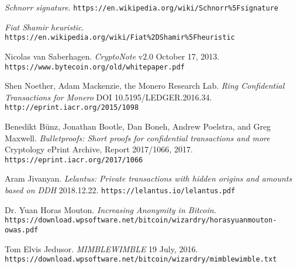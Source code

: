 \documentclass{article}
\begin{document}
\newpage
\begin{thebibliography}{8}

  \emph{Schnorr signature}.
  \texttt{https://en.wikipedia.org/wiki/Schnorr\%5Fsignature}

  \emph{Fiat Shamir heuristic}.
  \texttt{https://en.wikipedia.org/wiki/Fiat\%2DShamir\%5Fheuristic}

  Nicolas van Saberhagen.
  \emph{CryptoNote} v$2.0$ October 17, 2013.
  \texttt{https://www.bytecoin.org/old/whitepaper.pdf}

  Shen Noether, Adam Mackenzie, the Monero Research Lab.
  \emph{Ring Confidential Transactions for Monero} DOI 10.5195/LEDGER.2016.34.
  \texttt{http://eprint.iacr.org/2015/1098}

  Benedikt Bünz, Jonathan Bootle, Dan Boneh, Andrew Poelstra, and Greg Maxwell.
  \emph{Bulletproofs: Short proofs for confidential transactions and more} Cryptology ePrint Archive, Report 2017/1066, 2017.
  \texttt{https://eprint.iacr.org/2017/1066}

  Aram Jivanyan.
  \emph{Lelantus: Private transactions with hidden origins and amounts based on DDH} 2018.12.22.
  \texttt{https://lelantus.io/lelantus.pdf}

  Dr. Yuan Horas Mouton.
  \emph{Increasing Anonymity in Bitcoin}.
  \texttt{https://download.wpsoftware.net/bitcoin/wizardry/horasyuanmouton-owas.pdf}

  Tom Elvis Jedusor.
  \emph{MIMBLEWIMBLE} 19 July, 2016.
  \texttt{https://download.wpsoftware.net/bitcoin/wizardry/mimblewimble.txt}

\end{thebibliography}
\end{document}
